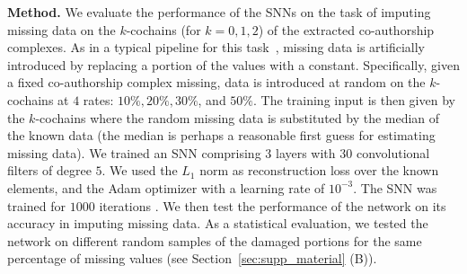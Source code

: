 \textbf{Method.} We evaluate the performance of the SNNs on the task of imputing missing data on the $k$-cochains (for $k=0,1,2$) of the extracted co-authorship complexes. As in a typical pipeline for this task~\cite{nelwamondo2007missing}, missing data is artificially introduced by replacing a portion of the values with a constant. Specifically, given a fixed co-authorship complex missing, data is introduced at random on the $k$-cochains at $4$ rates: $10\%,  20\%,  30\%$, and $50\%$. The training input is then given by the $k$-cochains where the random missing data is substituted by the median of the known data (the median is perhaps a reasonable first guess for estimating missing data). We trained an SNN comprising $3$ layers with $30$ convolutional filters of degree $5$. We used the $L_1$ norm as reconstruction loss over the known elements, and the Adam optimizer with a learning rate of $10^{-3}$. The SNN was trained for $1000$ iterations . We then test the performance of the network on its accuracy in imputing missing data. As a statistical evaluation, we tested the network on different random samples of the damaged portions for the same percentage of missing values (see Section~\ref{sec:supp_material} (B)). 

